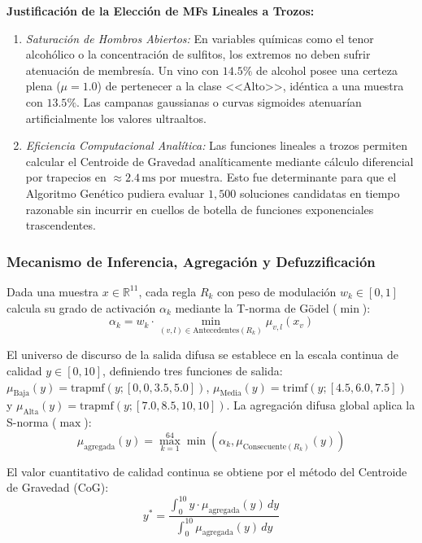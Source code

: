 \documentclass{article}
\begin{document}
\textbf{Justificación de la Elección de MFs Lineales a Trozos:}
\begin{enumerate}
    \item \textit{Saturación de Hombros Abiertos:} En variables químicas como el tenor alcohólico o la concentración de sulfitos, los extremos no deben sufrir atenuación de membresía. Un vino con $14.5\%$ de alcohol posee una certeza plena ($\mu = 1.0$) de pertenecer a la clase <<Alto>>, idéntica a una muestra con $13.5\%$. Las campanas gaussianas o curvas sigmoides atenuarían artificialmente los valores ultraaltos.
    \item \textit{Eficiencia Computacional Analítica:} Las funciones lineales a trozos permiten calcular el Centroide de Gravedad analíticamente mediante cálculo diferencial por trapecios en $\approx 2.4\,\text{ms}$ por muestra. Esto fue determinante para que el Algoritmo Genético pudiera evaluar $1,500$ soluciones candidatas en tiempo razonable sin incurrir en cuellos de botella de funciones exponenciales trascendentes.
\end{enumerate}

\subsubsection{Mecanismo de Inferencia, Agregación y Defuzzificación}
Dada una muestra $x \in \mathbb{R}^{11}$, cada regla $R_k$ con peso de modulación $w_k \in [0, 1]$ calcula su grado de activación $\alpha_k$ mediante la T-norma de Gödel ($\min$):
\begin{equation}
    \alpha_k = w_k \cdot \min_{(v, l) \in \text{Antecedentes}(R_k)} \mu_{v, l}(x_v)
\end{equation}

El universo de discurso de la salida difusa se establece en la escala continua de calidad $y \in [0, 10]$, definiendo tres funciones de salida: $\mu_{\text{Baja}}(y) = \text{trapmf}(y; [0, 0, 3.5, 5.0])$, $\mu_{\text{Media}}(y) = \text{trimf}(y; [4.5, 6.0, 7.5])$ y $\mu_{\text{Alta}}(y) = \text{trapmf}(y; [7.0, 8.5, 10, 10])$. La agregación difusa global aplica la S-norma ($\max$):
\begin{equation}
    \mu_{\text{agregada}}(y) = \max_{k=1}^{64} \min\left(\alpha_k, \mu_{\text{Consecuente}(R_k)}(y)\right)
\end{equation}

El valor cuantitativo de calidad continua se obtiene por el método del Centroide de Gravedad (CoG):
\begin{equation}
    y^* = \frac{\int_{0}^{10} y \cdot \mu_{\text{agregada}}(y)\,dy}{\int_{0}^{10} \mu_{\text{agregada}}(y)\,dy}
\end{equation}
\end{document}
